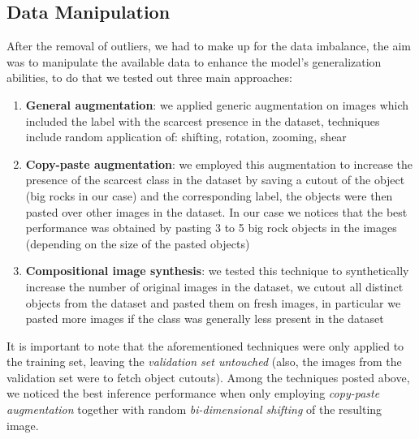 \documentclass[11pt]{article}
\begin{document}
\begin{multicols}{2}
        \subsection{Data Manipulation}
        After the removal of outliers, we had to make up for the data imbalance, the aim was to manipulate the available data to enhance the model's generalization abilities, to do that we tested out three main approaches:
        \begin{enumerate}
            \item \textbf{General augmentation}\cite{randaugment}: we applied generic augmentation on images which included the label with the scarcest presence in the dataset, techniques include random application of: shifting, rotation, zooming, shear
            \item \textbf{Copy-paste augmentation}\cite{copypaste}: we employed this augmentation to increase the presence of the scarcest class in the dataset by saving a cutout of the object (big rocks in our case) and the corresponding label, the objects were then pasted over other images in the dataset. In our case we notices that the best performance was obtained by pasting 3 to 5 big rock objects in the images (depending on the size of the pasted objects)
            \item \textbf{Compositional image synthesis}\cite{imagesynthesis}: we tested this technique to synthetically increase the number of original images in the dataset, we cutout all distinct objects from the dataset and pasted them on fresh images, in particular we pasted more images if the class was generally less present in the dataset
        \end{enumerate}
        It is important to note that the aforementioned techniques were only applied to the training set, leaving the \textit{validation set untouched} (also, the images from the validation set were to fetch object cutouts).
        Among the techniques posted above, we noticed the best inference performance when only employing \textit{copy-paste augmentation} together with random \textit{bi-dimensional shifting} of the resulting image.

        

\end{multicols}
\end{document}
